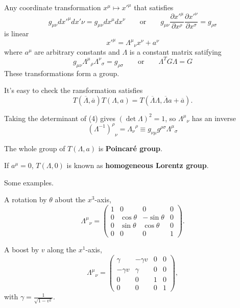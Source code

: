     \qquad Any coordinate transformation $x^\mu \mapsto x'^\mu$ that satisfies
            $$g_{\mu \nu}dx'^\mu dx'\nu = g_{\mu \nu} dx^\mu dx^\nu \qquad \text{or} \qquad g_{\mu \nu}\frac{\partial x'^\mu}{\partial x^\rho}\frac{\partial x'^\nu}{\partial x^\sigma} = g_{\rho \sigma}$$
is linear
            $$x'^\mu= {\Lambda^\mu}_\nu x^\nu +a^\nu$$
where $a^\mu$ are arbitrary constants and $\Lambda$ is a constant matrix satifying
            \begin{equation} g_{\mu\nu} {\Lambda^\mu}_\rho {\Lambda^\nu}_\sigma = g_{\rho \sigma} \qquad \text{or}\qquad  \Lambda^T G \Lambda =G\end{equation}
These transformations form a group. 

    \qquad It's easy to check the ransformation satisfies
        $$T(\overline{\Lambda}, \overline{a})T(\Lambda, a)= T(\overline{\Lambda} \Lambda, \overline{\Lambda}a +\overline{a}).$$

    \qquad Taking the determinant of (4) gives $(\det \Lambda)^2=1$, so ${\Lambda^\mu}_\nu$ has an inverse
        $${(\Lambda^{-1})^\rho}_\nu = {\Lambda_\nu}^\rho \equiv g_{\nu\mu} g^{\rho \sigma} {\Lambda^\mu}_\sigma$$
 
    \qquad The whole group of $T(\Lambda, a)$ is \textbf{Poincaré group}.

    \qquad If $a^\mu=0$, $T(\Lambda, 0)$ is known as \textbf{homogeneous Lorentz group}.

\begin{example} Some examples.

    \qquad A rotation by $\theta$ about the $x^3$-axis,
        $$ {\Lambda^\mu}_\nu=\begin{pmatrix}
            1 &0 &0 &0\\ 0 &\cos \theta &-\sin \theta &0\\ 0 &\sin\theta &\cos \theta &0\\ 0 &0 &0 &1
        \end{pmatrix}.$$
    
    \qquad A boost by $v$ along the $x^1$-axis,
        $${\Lambda^\mu}_\nu = \begin{pmatrix}\gamma &-\gamma v &0 &0\\ -\gamma v &\gamma &0 &0\\ 0 &0 &1 &0 \\
            0 &0 &0 &1
        \end{pmatrix},$$
    with $\gamma= \frac{1}{\sqrt{1-v^2}}$.

\end{example}

